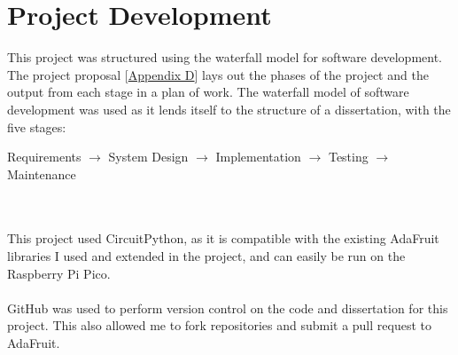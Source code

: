 \documentclass[12pt,a4paper]{report}
\begin{document}
\section{Project Development} 
This project was structured using the waterfall model for software development. The project proposal [\hyperref[appendixD]{Appendix D}] lays out the phases of the project and the output from each stage in a plan of work. The waterfall model of software development was used as it lends itself to the structure of a dissertation, with the five stages: \\
\centerline{Requirements $\rightarrow$ System Design $\rightarrow$ Implementation $\rightarrow$ Testing $\rightarrow$ Maintenance} \\ \\
This project used CircuitPython, as it is compatible with the existing AdaFruit libraries I used and extended in the project, and can easily be run on the Raspberry Pi Pico. \\ \\
GitHub was used to perform version control on the code and dissertation for this project. This also allowed me to fork repositories and submit a pull request to AdaFruit.
\end{document}
